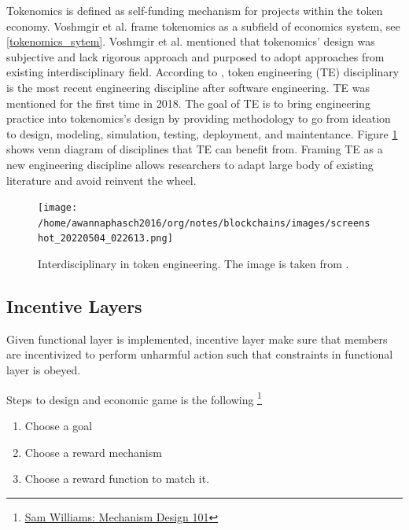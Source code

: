 \documentclass{IEEEtran}
\begin{document}
Tokenomics is defined as self-funding mechanism for projects within the token economy. Voshmgir et al. \cite{hellerstein2005anatomy} frame tokenomics as a subfield of economics system, see \ref{tokenomics_sytem}. Voshmgir et al. \cite{voshmgir2020foundations} mentioned that tokenomics' design was subjective and lack rigorous approach and purposed to adopt approaches from existing interdisciplinary field. According to \cite{kreitenweis2021token}, token engineering (TE) disciplinary is the most recent engineering discipline after software engineering. TE was mentioned for the first time in 2018. The goal of TE is to bring engineering practice into tokenomics's design by providing methodology to go from ideation to design, modeling, simulation, testing, deployment, and maintentance. Figure \ref{interdisciplinary_in_tokenomics} shows venn diagram of disciplines that TE can benefit from. Framing TE as a new engineering discipline allows researchers to adapt large body of existing literature and avoid reinvent the wheel.


\begin{figure}[htbp]
\centering
\texttt{[image: /home/awannaphasch2016/org/notes/blockchains/images/screenshot\_20220504\_022613.png]}
\caption{\label{interdisciplinary_in_tokenomics}Interdisciplinary in token engineering. The image is taken from \cite{voshmgir2020foundations}.}
\end{figure}

\subsection{Incentive Layers}
\label{sec:orgf659cdf}
Given functional layer is implemented, incentive layer make sure that members are incentivized to perform unharmful action such that constraints in functional layer is obeyed.

Steps to design and economic game is the following \footnote{\href{https://www.youtube.com/watch?v=gCFlGLbI\_kE\&ab\_channel=TechCrunch}{Sam Williams: Mechanism Design 101}}
\begin{enumerate}
\item Choose a goal
\item Choose a reward mechanism
\item Choose a reward function to match it.
\end{enumerate}
\end{document}
